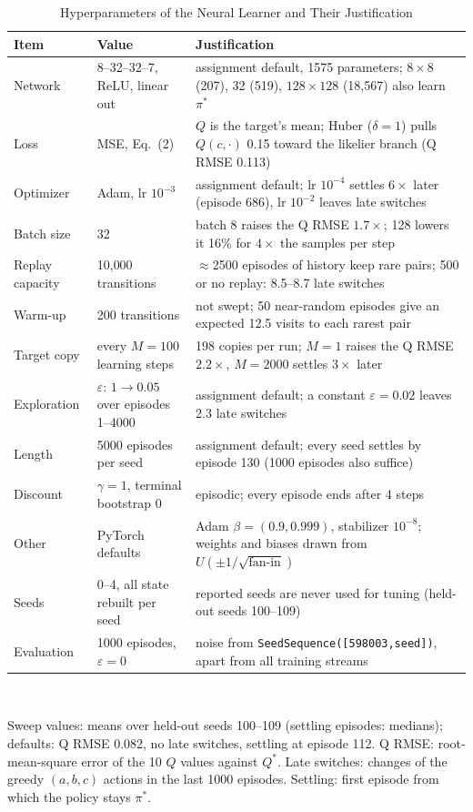 \documentclass[conference]{IEEEtran}
\newcommand{\code}[1]{\texttt{#1}}
\begin{document}
\begin{table}[t]
\caption{Hyperparameters of the Neural Learner and Their Justification}
\label{tab:hyper}
\centering\footnotesize
\setlength{\tabcolsep}{4pt}
\begin{tabularx}{\textwidth}{@{}l l L@{}}
\toprule
Item & Value & Justification\\
\midrule
Network & 8--32--32--7, ReLU, linear out & assignment default, 1575 parameters; $8\times8$ (207), 32 (519), $128\times128$ (18{,}567) also learn $\pi^*$\\
Loss & MSE, Eq.~(2) & $Q$ is the target's mean; Huber ($\delta=1$) pulls $Q(c,\cdot)$ 0.15 toward the likelier branch (Q RMSE 0.113)\\
Optimizer & Adam, lr $10^{-3}$ & assignment default; lr $10^{-4}$ settles $6\times$ later (episode 686), lr $10^{-2}$ leaves late switches\\
Batch size & 32 & batch 8 raises the Q RMSE $1.7\times$; 128 lowers it 16\% for $4\times$ the samples per step\\
Replay capacity & 10{,}000 transitions & $\approx$2500 episodes of history keep rare pairs; 500 or no replay: 8.5--8.7 late switches\\
Warm-up & 200 transitions & not swept; 50 near-random episodes give an expected 12.5 visits to each rarest pair\\
Target copy & every $M=100$ learning steps & 198 copies per run; $M=1$ raises the Q RMSE $2.2\times$, $M=2000$ settles $3\times$ later\\
Exploration & $\varepsilon$: $1\to0.05$ over episodes 1--4000 & assignment default; a constant $\varepsilon=0.02$ leaves 2.3 late switches\\
Length & 5000 episodes per seed & assignment default; every seed settles by episode 130 (1000 episodes also suffice)\\
Discount & $\gamma=1$, terminal bootstrap 0 & episodic; every episode ends after 4 steps\\
Other & PyTorch defaults & Adam $\beta=(0.9,0.999)$, stabilizer $10^{-8}$; weights and biases drawn from $U(\pm1/\sqrt{\text{fan-in}})$\\
Seeds & 0--4, all state rebuilt per seed & reported seeds are never used for tuning (held-out seeds 100--109)\\
Evaluation & 1000 episodes, $\varepsilon=0$ & noise from \code{SeedSequence([598003,seed])}, apart from all training streams\\
\bottomrule
\end{tabularx}
\\[2pt]
\parbox{\textwidth}{\footnotesize Sweep values: means over held-out seeds 100--109 (settling
episodes: medians); defaults: Q RMSE 0.082, no late switches, settling at episode 112. Q RMSE:
root-mean-square error of the 10 $Q$ values against $Q^*$. Late switches: changes of the greedy
$(a,b,c)$ actions in the last 1000 episodes. Settling: first episode from which the policy stays
$\pi^*$.}
\end{table}
\end{document}

